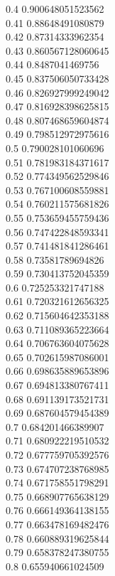 {0.4	0.900648051523562\\
0.41	0.88648491080879\\
0.42	0.87314333962354\\
0.43	0.860567128060645\\
0.44	0.8487041469756\\
0.45	0.837506050733428\\
0.46	0.826927999249042\\
0.47	0.816928398625815\\
0.48	0.807468659604874\\
0.49	0.798512972975616\\
0.5	0.790028101060696\\
0.51	0.781983184371617\\
0.52	0.774349562529846\\
0.53	0.767100608559881\\
0.54	0.760211575681826\\
0.55	0.753659455759436\\
0.56	0.747422848593341\\
0.57	0.741481841286461\\
0.58	0.73581789694826\\
0.59	0.730413752045359\\
0.6	0.725253321747188\\
0.61	0.720321612656325\\
0.62	0.715604642353188\\
0.63	0.711089365223664\\
0.64	0.706763604075628\\
0.65	0.702615987086001\\
0.66	0.698635889653896\\
0.67	0.694813380767411\\
0.68	0.691139173521731\\
0.69	0.687604579454389\\
0.7	0.684201466389907\\
0.71	0.680922219510532\\
0.72	0.677759705392576\\
0.73	0.674707238768985\\
0.74	0.671758551798291\\
0.75	0.668907765638129\\
0.76	0.666149364138155\\
0.77	0.663478169482476\\
0.78	0.660889319625844\\
0.79	0.658378247380755\\
0.8	0.655940661024509\\
}
